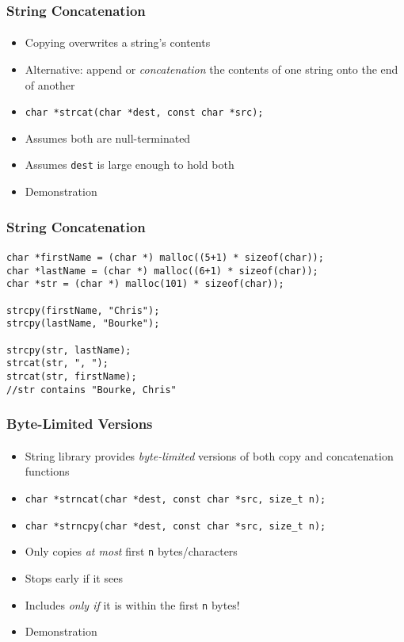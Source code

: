 \documentclass[]{beamer}
\begin{document}
\begin{frame}[fragile]
    \frametitle{String Concatenation}
    \framesubtitle{}

\begin{itemize}[<+->]
  \item Copying overwrites a string's contents
  \item Alternative: append or \emph{concatenation} the contents of one string onto the end of another
  \item \texttt{char *strcat(char *dest, const char *src);}
  \item Assumes both are null-terminated
  \item Assumes \texttt{dest} is large enough to hold both
  \item Demonstration
\end{itemize}
  
\end{frame}

\begin{frame}[fragile]
    \frametitle{String Concatenation}
    \framesubtitle{}

\begin{verbatim}
char *firstName = (char *) malloc((5+1) * sizeof(char));
char *lastName = (char *) malloc((6+1) * sizeof(char));
char *str = (char *) malloc(101) * sizeof(char));

strcpy(firstName, "Chris");
strcpy(lastName, "Bourke");

strcpy(str, lastName);
strcat(str, ", ");
strcat(str, firstName);
//str contains "Bourke, Chris"
\end{verbatim}

\end{frame}

\begin{frame}[fragile]
    \frametitle{Byte-Limited Versions}
    \framesubtitle{}

\begin{itemize}[<+->]
  \item String library provides \emph{byte-limited} versions of
  both copy and concatenation functions
  \item \texttt{char *strncat(char *dest, const char *src, size_t n);}
  \item \texttt{char *strncpy(char *dest, const char *src, size_t n);}
  \item Only copies \emph{at most} first \texttt{n} bytes/characters
  \item Stops early if it sees \texttt{\0}
  \item Includes \texttt{\0} \emph{only if} it is within the first
  \texttt{n} bytes!
  \item Demonstration
\end{itemize}
  
\end{frame}
\end{document}
